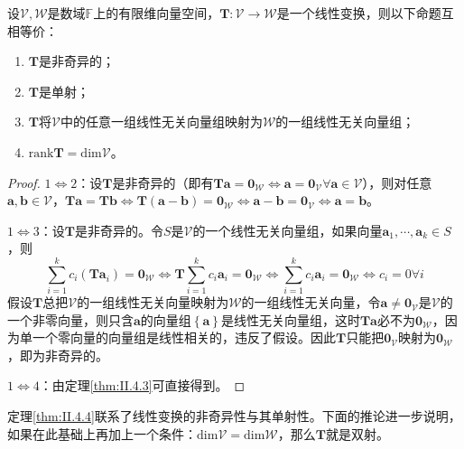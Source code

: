 \documentclass[main.tex]{subfiles}
\begin{document}
\begin{theorem}\label{thm:II.4.4}
设$\mathcal{V},\mathcal{W}$是数域$\mathbb{F}$上的有限维向量空间，$\mathbf{T}:\mathcal{V}\rightarrow\mathcal{W}$是一个线性变换，则以下命题互相等价：
\begin{enumerate}
    \item $\mathbf{T}$是非奇异的；
    \item $\mathbf{T}$是单射；
    \item $\mathbf{T}$将$\mathcal{V}$中的任意一组线性无关向量组映射为$\mathcal{W}$的一组线性无关向量组；
    \item $\mathrm{rank}\mathbf{T}=\mathrm{dim}\mathcal{V}$。
\end{enumerate}
\end{theorem}
\begin{proof}
$1\Leftrightarrow 2$：设$\mathbf{T}$是非奇异的（即有$\mathbf{Ta}=\mathbf{0}_\mathcal{W}\Leftrightarrow\mathbf{a}=\mathbf{0}_\mathcal{V}\forall\mathbf{a}\in\mathcal{V}$），则对任意$\mathbf{a},\mathbf{b}\in\mathcal{V}$，$\mathbf{Ta}=\mathbf{Tb}\Leftrightarrow\mathbf{T}\left(\mathbf{a}-\mathbf{b}\right)=\mathbf{0}_\mathcal{W}\Leftrightarrow\mathbf{a}-\mathbf{b}=\mathbf{0}_\mathcal{V}\Leftrightarrow\mathbf{a}=\mathbf{b}$。

$1\Leftrightarrow 3$：设$\mathbf{T}$是非奇异的。令$S$是$\mathcal{V}$的一个线性无关向量组，如果向量$\mathbf{a}_1,\cdots,\mathbf{a}_k\in S$，则
\[
\sum_{i=1}^kc_i\left(\mathbf{Ta}_i\right)=\mathbf{0}_\mathcal{W}\Leftrightarrow\mathbf{T}\sum_{i=1}^kc_i\mathbf{a}_i=\mathbf{0}_\mathcal{W}\Leftrightarrow\sum_{i=1}^kc_i\mathbf{a}_i=\mathbf{0}_\mathcal{W}\Leftrightarrow c_i=0\forall i
\]
假设$\mathbf{T}$总把$\mathcal{V}$的一组线性无关向量映射为$\mathcal{W}$的一组线性无关向量，令$\mathbf{a}\neq\mathbf{0}_\mathcal{V}$是$\mathcal{V}$的一个非零向量，则只含$\mathbf{a}$的向量组$\left\{\mathbf{a}\right\}$是线性无关向量组，这时$\mathbf{Ta}$必不为$\mathbf{0}_\mathcal{W}$，因为单一个零向量的向量组是线性相关的，违反了假设。因此$\mathbf{T}$只能把$\mathbf{0}_\mathcal{V}$映射为$\mathbf{0}_\mathcal{W}$，即为非奇异的。

$1\Leftrightarrow 4$：由定理\ref{thm:II.4.3}可直接得到。
\end{proof}

定理\ref{thm:II.4.4}联系了线性变换的非奇异性与其单射性。下面的推论进一步说明，如果在此基础上再加上一个条件：$\mathrm{dim}\mathcal{V}=\mathrm{dim}\mathcal{W}$，那么$\mathbf{T}$就是双射。
\end{document}
